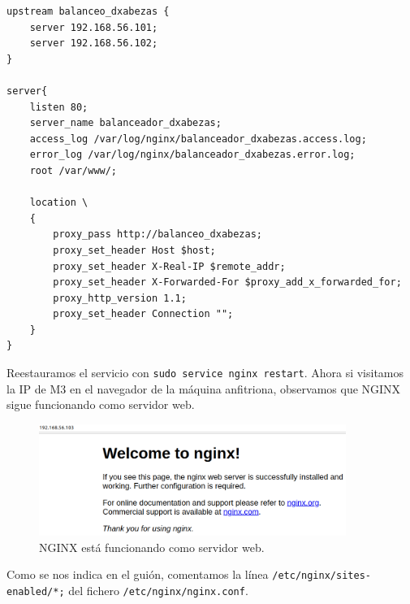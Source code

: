 \documentclass{article}
\begin{document}
\begin{Verbatim}[tabsize=4]
upstream balanceo_dxabezas {
	server 192.168.56.101;
	server 192.168.56.102;
}

server{
	listen 80;
	server_name balanceador_dxabezas;
	access_log /var/log/nginx/balanceador_dxabezas.access.log;
	error_log /var/log/nginx/balanceador_dxabezas.error.log;
	root /var/www/;

	location \
	{
		proxy_pass http://balanceo_dxabezas;
		proxy_set_header Host $host;
		proxy_set_header X-Real-IP $remote_addr;
		proxy_set_header X-Forwarded-For $proxy_add_x_forwarded_for;
		proxy_http_version 1.1;
		proxy_set_header Connection "";
	}
}
\end{Verbatim}

Reestauramos el servicio con \verb^sudo service nginx restart^. Ahora si visitamos la IP de M3
en el navegador de la máquina anfitriona, observamos que NGINX sigue funcionando como servidor
web.

\begin{figure}[H]
	\centering
	\includegraphics[width=100mm]{imgs/nginx-web}
	\caption{NGINX está funcionando como servidor web.}
	\label{fig:nginx-web}
\end{figure}

Como se nos indica en el guión, comentamos la línea \verb^/etc/nginx/sites-enabled/*;^
del fichero \texttt{/etc/nginx/nginx.conf}.
\end{document}
